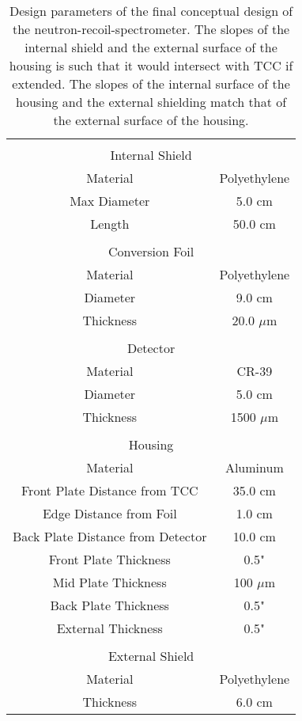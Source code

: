 \begin{table}[!h]
	\caption{Design parameters of the final conceptual design of the neutron-recoil-spectrometer. The slopes of the internal shield and the external surface of the housing is such that it would intersect with TCC if extended. The slopes of the internal surface of the housing and the external shielding match that of the external surface of the housing. }
	\label{tab_designParameters}
	\renewcommand{\arraystretch}{1.2} 
	\begin{tabular}{  c c  }
		&\\
		\multicolumn{2}{c}{Internal Shield} \\\hline
		Material & Polyethylene \\
		Max Diameter & 5.0 cm \\
		Length	& 50.0 cm \\
		&\\
		\multicolumn{2}{c}{Conversion Foil} \\\hline
		Material & Polyethylene \\
		Diameter & 9.0 cm \\
		Thickness	& 20.0 $\mu$m \\
		&\\
		\multicolumn{2}{c}{Detector} \\\hline
		Material & CR-39 \\
		Diameter & 5.0 cm \\
		Thickness	& 1500 $\mu$m \\
		&\\
		\multicolumn{2}{c}{Housing} \\\hline
		Material & Aluminum \\
		Front Plate Distance from TCC & 35.0 cm \\
		Edge Distance from Foil & 1.0 cm \\			 
		Back Plate Distance from Detector & 10.0 cm \\	
		Front Plate Thickness & 0.5" \\
		Mid Plate Thickness & 100 $\mu$m \\
		Back Plate Thickness & 0.5" \\
		External Thickness & 0.5" \\
		&\\
		\multicolumn{2}{c}{External Shield} \\\hline
		Material & Polyethylene \\
		Thickness	& 6.0 cm \\
	\end{tabular}		
\end{table}

